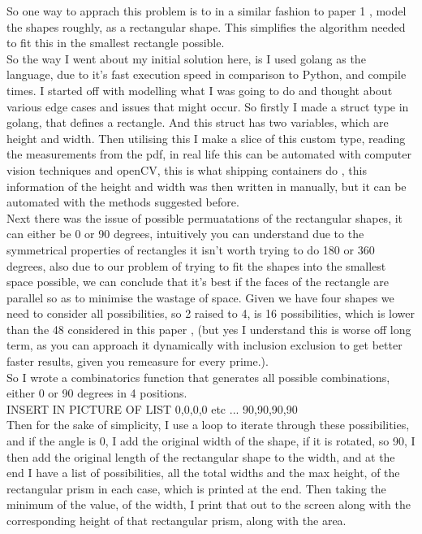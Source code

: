 \documentclass[a4paper]{article}
\begin{document}
    
    So one way to apprach this problem is to in a similar fashion to paper 1 \cite{mongolia}, model the shapes roughly, as a rectangular shape. This simplifies the algorithm needed to fit this in the smallest rectangle possible. \\

    So the way I went about my initial solution here, is I used golang as the language, due to it's fast execution speed in comparison to Python, and compile times. I started off with modelling what I was going to do and thought about various edge cases and issues that might occur. So firstly I made a struct type in golang, that defines a rectangle. And this struct has two variables, which are height and width. Then utilising this I make a slice of this custom type, reading the measurements from the pdf, in real life this can be automated with computer vision techniques and openCV, this is what shipping containers do \cite{packing}, this information of the height and width was then written in manually, but it can be automated with the methods suggested before.\\

    Next there was the issue of possible permuatations of the rectangular shapes, it can either be 0 or 90 degrees, intuitively you can understand due to the symmetrical properties of rectangles it isn't worth trying to do 180 or 360 degrees, also due to our problem of trying to fit the shapes into the smallest space possible, we can conclude that it's best if the faces of the rectangle are parallel so as to minimise the wastage of space. Given we have four shapes we need to consider all possibilities, so 2 raised to 4, is 16 possibilities, which is lower than the 48 considered in this paper \cite{bismark}, (but yes I understand this is worse off long term, as you can approach it dynamically with inclusion exclusion to get better faster results, given you remeasure for every prime.). \\

    So I wrote a combinatorics function that generates all possible combinations, either 0 or 90 degrees in 4 positions. \\

    INSERT IN PICTURE OF LIST 0,0,0,0 etc ... 90,90,90,90\\

    Then for the sake of simplicity, I use a loop to iterate through these possibilities, and if the angle is 0, I add the original width of the shape, if it is rotated, so 90, I then add the original length of the rectangular shape to the width, and at the end I have a list of possibilities, all the total widths and the max height, of the rectangular prism in each case, which is printed at the end. Then taking the minimum of the value, of the width, I print that out to the screen along with the corresponding height of that rectangular prism, along with the area.\\

    







    

 

\end{document}
